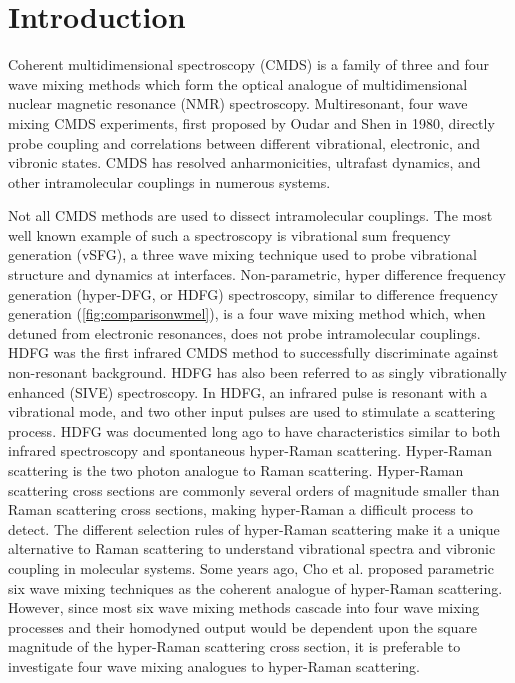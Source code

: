 \documentclass[aip, jcp, reprint, onecolumn]{revtex4-2}
\begin{document}
\maketitle

\section{Introduction}
Coherent multidimensional spectroscopy (CMDS) is a family of three and four wave mixing methods which form the optical analogue of multidimensional nuclear magnetic resonance (NMR) spectroscopy.\cite{RN103, Cho2008}
Multiresonant, four wave mixing CMDS experiments, first proposed by Oudar and Shen in 1980,\cite{RN307} directly probe coupling and correlations between different vibrational, electronic, and vibronic states. \cite{RN307, RN281, RN103, RN342, Cho2008, Dong2015, Ogilvie2019, RN325} 
CMDS has resolved anharmonicities, ultrafast dynamics, and other intramolecular couplings in numerous systems. \cite{RN342, RN343, RN324, Czech2015, Gaynor2017, Ogilvie2019, RN325}

Not all CMDS methods are used to dissect intramolecular couplings.\cite{Shen1987_CPL}
The most well known example of such a spectroscopy is vibrational sum frequency generation (vSFG), a three wave mixing technique used to probe vibrational structure and dynamics at interfaces. \cite{Shen1987_CPL, RN224}
Non-parametric, hyper difference frequency generation (hyper-DFG, or HDFG) spectroscopy, similar to difference frequency generation (\autoref{fig:comparisonwmel}), is a four wave mixing method which, when detuned from  electronic resonances, does not probe intramolecular couplings. 
HDFG was the first infrared CMDS method to successfully discriminate against non-resonant background.\cite{RN351, RN352}
HDFG has also been referred to as singly vibrationally enhanced (SIVE) spectroscopy. \cite{RN351}
In HDFG, an infrared pulse is resonant with a vibrational mode, and two other input pulses are used to stimulate a scattering process.
HDFG was documented long ago to have characteristics similar to both infrared spectroscopy and spontaneous hyper-Raman scattering. \cite{RN352}
Hyper-Raman scattering is the two photon analogue to Raman scattering. \cite{Cyvin1965, Terhune1965, Kozich2007}
Hyper-Raman scattering cross sections are commonly several orders of magnitude smaller than Raman scattering cross sections, making hyper-Raman a difficult process to detect.\cite{RN515, Kelley2010} 
The different selection rules of hyper-Raman scattering make it a unique alternative to Raman scattering to understand vibrational spectra and vibronic coupling in molecular systems. \cite{Olson2018}
Some years ago, Cho et al. proposed parametric six wave mixing techniques as the coherent analogue of hyper-Raman scattering. \cite{Cho1997, Cho1998}
However, since most six wave mixing methods cascade into four wave mixing processes and their homodyned output would be dependent upon the square magnitude of the hyper-Raman scattering cross section, \cite{RN243, RN515, Cho1997, Cho2000_Cascade} it is preferable to investigate four wave mixing analogues to hyper-Raman scattering.
\end{document}
